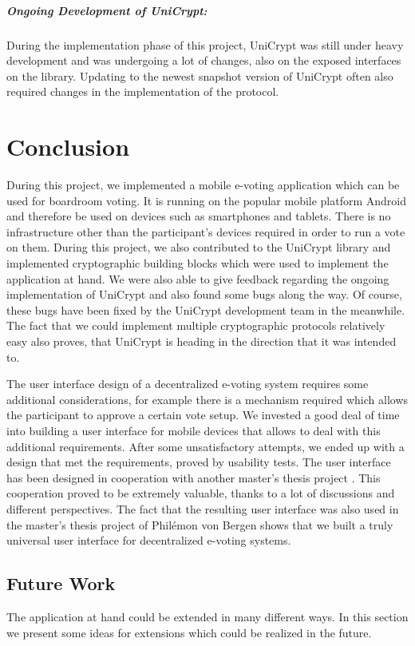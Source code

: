 \documentclass[numbers=noenddot, abstract=on, a4paper, headsepline,
footsepline, oneside, openright, draft=off, listof=leveldown]{scrreprt}
\begin{document}
\paragraph{Ongoing Development of UniCrypt:} During the implementation phase of
this project, UniCrypt was still under heavy development and was undergoing a
lot of changes, also on the exposed interfaces on the library. Updating to the
newest snapshot version of UniCrypt often also required changes in the
implementation of the protocol.


\chapter{Conclusion}
\label{cha:conclusion}
During this project, we implemented a mobile e-voting application which can be
used for boardroom voting. It is running on the popular mobile platform
Android and therefore be used on devices such as smartphones and tablets. There
is no infrastructure other than the participant's devices required in order to
run a vote on them. During this project, we also contributed to the UniCrypt
library and implemented cryptographic building blocks which were used to
implement the application at hand. We were also able to give feedback regarding
the ongoing implementation of UniCrypt and also found some bugs along the way.
Of course, these bugs have been fixed by the UniCrypt development team in the
meanwhile. The fact that we could implement multiple cryptographic protocols
relatively easy also proves, that UniCrypt is heading in the direction that it
was intended to. 

The user interface design of a decentralized e-voting system requires some
additional considerations, for example there is a mechanism required which
allows the participant to approve a certain vote setup. We invested a good deal
of time into building a user interface for mobile devices that allows to deal
with this additional requirements. After some unsatisfactory attempts, we ended
up with a design that met the requirements, proved by usability tests. The user
interface has been designed in cooperation with another master's thesis project
\cite{vonBergen14}. This cooperation proved to be extremely valuable, thanks to
a lot of discussions and different perspectives. The fact that the resulting
user interface was also used in the master's thesis project of Philémon von
Bergen shows that we built a truly universal user interface for decentralized
e-voting systems.

\section{Future Work}
\label{sec:futurework}
The application at hand could be extended in many different ways. In this
section we present some ideas for extensions which could be realized in the future.
\end{document}
